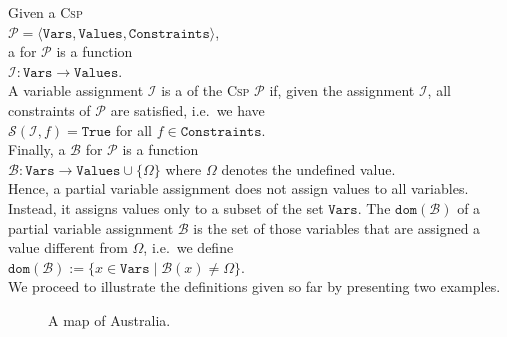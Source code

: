 \noindent
Given a \textsc{Csp}
\\[0.2cm]
\hspace*{1.3cm}
 $\mathcal{P} = \langle \mathtt{Vars}, \mathtt{Values}, \mathtt{Constraints} \rangle$, 
\\[0.2cm]
a  for $\mathcal{P}$ is a function
\\[0.2cm]
\hspace*{1.3cm}
$\mathcal{I}: \mathtt{Vars} \rightarrow \mathtt{Values}$.
\\[0.2cm]
A variable assignment $\mathcal{I}$ is a  of the \textsc{Csp} $\mathcal{P}$ 
if, given the assignment $\mathcal{I}$, all constraints of $\mathcal{P}$ are satisfied, i.e.~we have
\\[0.2cm]
\hspace*{1.3cm}
$\mathcal{S}(\mathcal{I}, f) = \mathtt{True}$ \quad for all $f \in \mathtt{Constraints}$.
\\[0.2cm]
Finally, a   $\mathcal{B}$ for $\mathcal{P}$ is a function
\\[0.2cm]
\hspace*{1.3cm}
$\mathcal{B}: \mathtt{Vars} \rightarrow \mathtt{Values} \cup \{ \Omega \}$ \quad where $\Omega$ denotes the undefined value.
\\[0.2cm]
Hence, a partial variable assignment does not assign values to all variables.  Instead, it assigns values only
to a subset of the set $\mathtt{Vars}$.  The  $\mathtt{dom}(\mathcal{B})$  of a partial variable assignment $\mathcal{B}$ is the
set of those variables that are assigned a value different from $\Omega$, i.e.~we define
\\[0.2cm]
\hspace*{1.3cm}
$\mathtt{dom}(\mathcal{B}) := \bigl\{ x \in \mathtt{Vars} \mid \mathcal{B}(x) \not= \Omega \bigr\}$.
\\[0.2cm]
We proceed to illustrate the definitions given so far by presenting two examples.


\begin{figure}[!ht]
  \centering
  \caption{A map of Australia.}
  \label{fig:australia.pdf}
\end{figure}


